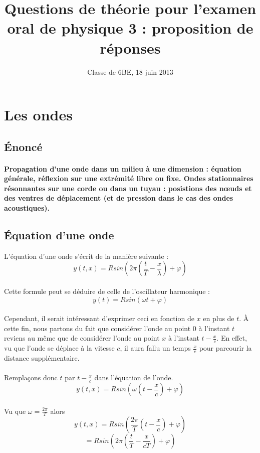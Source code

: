\documentclass[a4paper]{article}
\title{Questions de théorie pour l'examen oral de physique 3 : proposition de réponses}
\date{Classe de 6BE, 18 juin 2013}
\author{}
\begin{document}
\maketitle
\section{Les ondes}
\subsection{Énoncé}
\paragraph{}\textbf{Propagation d'une onde dans un milieu à une dimension : équation générale, réflexion sur une extrémité libre ou fixe. Ondes stationnaires résonnantes sur une corde ou dans un tuyau : posistions des nœuds et des ventres de déplacement (et de pression dans le cas des ondes acoustiques).}
\subsection{Équation d'une onde}
L'équation d'une onde s'écrit de la manière suivante :
\[y(t,x)=Rsin\left(2\pi\left(\frac{t}{T}-\frac{x}{\lambda}\right)+\varphi\right)\]
\paragraph{}Cette formule peut se déduire de celle de l'oscillateur harmonique :
\[y(t)=Rsin(\omega t+\varphi)\]
\paragraph{}Cependant, il serait intéressant d'exprimer ceci en fonction de $x$ en plus de $t$. À cette fin, nous partons du fait que considérer l'onde au point $0$ à l'instant $t$ reviens au même que de considérer l'onde au point $x$ à l'instant $t-\frac{x}{c}$. En effet, vu que l'onde se déplace à la vitesse $c$, il aura fallu un temps $\frac{x}{c}$ pour parcourir la distance supplémentaire.
\paragraph{}Remplaçons donc $t$ par $t-\frac{x}{c}$ dans l'équation de l'onde.
\[y(t,x)=Rsin\left(\omega \left(t-\frac{x}{c}\right)+\varphi\right)\]
\paragraph{}Vu que $\omega=\frac{2\pi}{T}$ alors
\[y(t,x)=Rsin\left(\frac{2\pi}{T} \left(t-\frac{x}{c}\right)+\varphi\right)\]
\[=Rsin\left(2\pi \left(\frac{t}{T}-\frac{x}{cT}\right)+\varphi\right)\]
\end{document}
